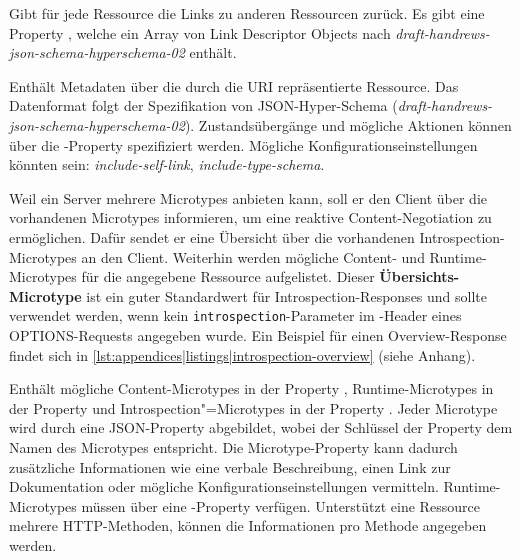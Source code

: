\begin{microtypedef}
    Gibt für jede Ressource die Links zu anderen Ressourcen zurück. Es gibt eine Property , welche ein Array von Link Descriptor Objects nach \textit{draft-handrews-json-schema-hyperschema-02} enthält.
\end{microtypedef}

\begin{microtypedef}
    Enthält Metadaten über die durch die URI repräsentierte Ressource. Das Datenformat folgt der Spezifikation von JSON-Hyper-Schema (\textit{draft-handrews-json-schema-hyperschema-02}). Zustandsübergänge und mögliche Aktionen können über die -Property spezifiziert werden. Mögliche Konfigurationseinstellungen könnten sein: \textit{include-self-link}, \textit{include-type-schema}.
\end{microtypedef}

\noindent{}Weil ein Server mehrere Microtypes anbieten kann, soll er den Client über die vorhandenen Microtypes informieren, um eine reaktive Content-Negotiation zu ermöglichen. Dafür sendet er eine Übersicht über die vorhandenen Introspection-Microtypes an den Client. Weiterhin werden mögliche Content- und Runtime-Microtypes für die angegebene Ressource aufgelistet. Dieser \textbf{Übersichts-Microtype} ist ein guter Standardwert für Introspection-Responses und sollte verwendet werden, wenn kein \texttt{introspection}-Parameter im -Header eines OPTIONS-Requests angegeben wurde. Ein Beispiel für einen Overview-Response findet sich in \cref{lst:appendices|listings|introspection-overview} (siehe Anhang).

\begin{microtypedef}
    Enthält mögliche Content-Microtypes in der Property , Runtime-Microtypes in der Property  und Introspection"=Microtypes in der Property . Jeder Microtype wird durch eine JSON-Property abgebildet, wobei der Schlüssel der Property dem Namen des Microtypes entspricht. Die Microtype-Property kann dadurch zusätzliche Informationen wie eine verbale Beschreibung, einen Link zur Dokumentation oder mögliche Konfigurationseinstellungen vermitteln. Runtime-Microtypes müssen über eine -Property verfügen. Unterstützt eine Ressource mehrere HTTP-Methoden, können die Informationen pro Methode angegeben werden.
\end{microtypedef}

